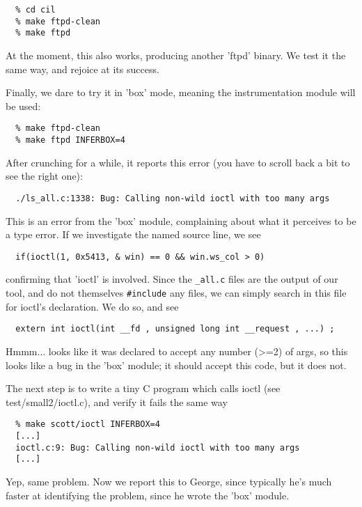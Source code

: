 \documentclass{book}
\def\t#1{{\tt #1}}
\begin{document}
\begin{verbatim}
  % cd cil
  % make ftpd-clean
  % make ftpd
\end{verbatim}
  
At the moment, this also works, producing another 'ftpd' binary.  We test
it the same way, and rejoice at its success.

Finally, we dare to try it in 'box' mode, meaning the instrumentation
module will be used:

\begin{verbatim}
  % make ftpd-clean
  % make ftpd INFERBOX=4
\end{verbatim}
  
After crunching for a while, it reports this error (you have to scroll
back a bit to see the right one):

\begin{verbatim}
  ./ls_all.c:1338: Bug: Calling non-wild ioctl with too many args
\end{verbatim}

This is an error from the 'box' module, complaining about what it
perceives to be a type error.  If we investigate the named source
line, we see

\begin{verbatim}
  if(ioctl(1, 0x5413, & win) == 0 && win.ws_col > 0)
\end{verbatim}

confirming that 'ioctl' is involved.  Since the \t{*\_all.c} files are the
output of our tool, and do not themselves \t{\#include} any files, we can
simply search in this file for ioctl's declaration.  We do so, and see

\begin{verbatim}
  extern int ioctl(int __fd , unsigned long int __request , ...) ;
\end{verbatim}
  
Hmmm... looks like it was declared to accept any number (>=2) of args, so
this looks like a bug in the 'box' module; it should accept this code,
but it does not.

The next step is to write a tiny C program which calls ioctl (see
test/small2/ioctl.c), and verify it fails the same way

\begin{verbatim}
  % make scott/ioctl INFERBOX=4
  [...]
  ioctl.c:9: Bug: Calling non-wild ioctl with too many args
  [...]
\end{verbatim}
  
Yep, same problem.  Now we report this to George, since typically he's
much faster at identifying the problem, since he wrote the 'box' module.
\end{document}
